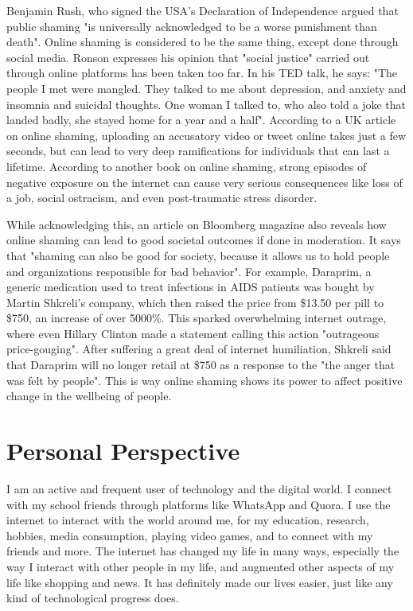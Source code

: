 \documentclass[a4paper, 11pt]{article}
\begin{document}
Benjamin Rush, who signed the USA's Declaration of Independence argued that public shaming "is universally acknowledged to be a worse punishment than death". Online shaming is considered to be the same thing, except done through social media. Ronson expresses his opinion that "social justice" carried out through online platforms has been taken too far. In his TED talk, he says: "The people I met were mangled. They talked to me about depression, and anxiety and insomnia and suicidal thoughts. One woman I talked to, who also told a joke that landed badly, she stayed home for a year and a half".\cite{jon-ronson-ted-talk} According to a UK article on online shaming, uploading an accusatory video or tweet online takes just a few seconds, but can lead to very deep ramifications for individuals that can last a lifetime.\cite{telegraph-online-shaming} According to another book on online shaming, strong episodes of negative exposure on the internet can cause very serious consequences like loss of a job, social ostracism, and even post-traumatic stress disorder.\cite{shame-nation-book}

While acknowledging this, an article on Bloomberg magazine also reveals how online shaming can lead to good societal outcomes if done in moderation.\cite{bloomberg-online-shaming} It says that "shaming can also be good for society, because it allows us to hold people and organizations responsible for bad behavior". For example, Daraprim, a generic medication used to treat infections in AIDS patients was bought by Martin Shkreli's company, which then raised the price from \$13.50 per pill to \$750, an increase of over 5000\%.\cite{washington-martin} This sparked overwhelming internet outrage, where even Hillary Clinton made a statement calling this action "outrageous price-gouging". After suffering a great deal of internet humiliation, Shkreli said that Daraprim will no longer retail at \$750 as a response to the "the anger that was felt by people". This is way online shaming shows its power to affect positive change in the wellbeing of people.

\section{Personal Perspective}

I am an active and frequent user of technology and the digital world. I connect with my school friends through platforms like WhatsApp and Quora. I use the internet to interact with the world around me, for my education, research, hobbies, media consumption, playing video games, and to connect with my friends and more. The internet has changed my life in many ways, especially the way I interact with other people in my life, and augmented other aspects of my life like shopping and news. It has definitely made our lives easier, just like any kind of technological progress does.
\end{document}
